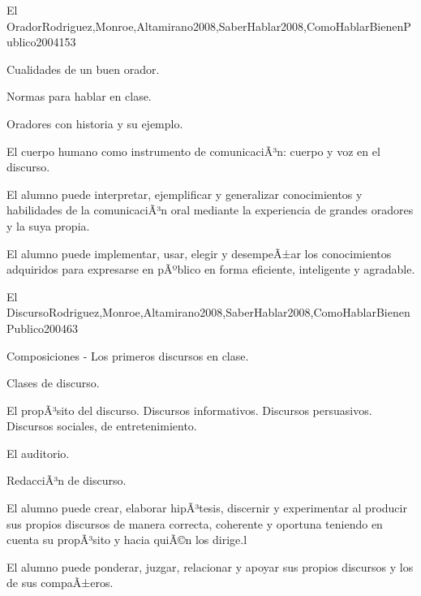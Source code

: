 \begin{syllabus}
\begin{unit}{El Orador}{Rodriguez,Monroe,Altamirano2008,SaberHablar2008,ComoHablarBienenPublico2004}{15}{3}
\begin{topics}
	\item Cualidades de un buen orador.
	\item Normas para hablar en clase.
	\item Oradores con historia y su ejemplo.
	\item El cuerpo humano como instrumento de comunicaciÃ³n: cuerpo y voz en el discurso.
\end{topics}
\begin{unitgoals}
	\item El alumno puede interpretar, ejemplificar y generalizar
conocimientos y habilidades de la comunicaciÃ³n oral mediante la experiencia de grandes oradores y la suya propia.
	\item El alumno puede implementar, usar, elegir y desempeÃ±ar los conocimientos adquiridos para  expresarse en pÃºblico en forma eficiente, inteligente y agradable.
\end{unitgoals}
\end{unit}

\begin{unit}{El Discurso}{Rodriguez,Monroe,Altamirano2008,SaberHablar2008,ComoHablarBienenPublico2004}{6}{3}
\begin{topics}
	\item Composiciones - Los primeros discursos en clase.
	\item Clases de discurso.
	\item El propÃ³sito del discurso. Discursos informativos. Discursos persuasivos. Discursos sociales, de entretenimiento.
	\item El auditorio.	
	\item RedacciÃ³n de discurso.
\end{topics}
\begin{unitgoals}
	\item El alumno puede crear, elaborar hipÃ³tesis, discernir y experimentar al producir sus propios discursos de manera correcta, coherente y oportuna teniendo en cuenta su propÃ³sito y hacia quiÃ©n los dirige.l 
	\item El alumno puede ponderar, juzgar, relacionar y apoyar sus propios discursos y los de sus compaÃ±eros.
\end{unitgoals}
\end{unit}


\end{syllabus}
